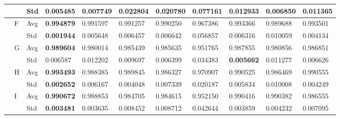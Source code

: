 \documentclass{article} %
\begin{document}
\begin{tabular}{|p{0.5in}|p{0.3in}|p{0.3in}|p{0.5in}|p{0.6in}|p{0.5in}|p{0.5in}|p{0.5in}|p{0.5in}|p{0.5in}|p{0.5in}|}
 &  & Std & \textbf{0.005485 } & 0.007749  & 0.022804  & 0.020780  & 0.077161  & 0.012933  & 0.006850  & 0.011365  \\ \hline 
 & F & Avg & \textbf{0.994879 } & 0.991597  & 0.991257  & 0.990250  & 0.967386  & 0.993366  & 0.989688  & 0.993501  \\ \hline 
 &  & Std & \textbf{0.001944 } & 0.005648  & 0.006457  & 0.006642  & 0.056857  & 0.006316  & 0.010059  & 0.004134  \\ \hline 
 & G & Avg & \textbf{0.989604 } & 0.980014  & 0.985439  & 0.985635  & 0.951765  & 0.987855  & 0.980856  & 0.986851  \\ \hline 
 &  & Std & 0.006587  & 0.012202  & 0.009697  & 0.006399  & 0.034383  & \textbf{0.005662 } & 0.011277  & 0.006626  \\ \hline 
 & H & Avg & \textbf{0.993493 } & 0.988385  & 0.989845  & 0.986327  & 0.970907  & 0.990525  & 0.986469  & 0.990555  \\ \hline 
 &  & Std & \textbf{0.002652 } & 0.006167  & 0.004048  & 0.007339  & 0.020187  & 0.005834  & 0.010008  & 0.004249  \\ \hline 
 & I & Avg & \textbf{0.990672 } & 0.988853  & 0.984705  & 0.984615  & 0.952150  & 0.990416  & 0.990382  & 0.986555  \\ \hline 
 &  & Std & \textbf{0.003481 } & 0.003635  & 0.008452  & 0.008712  & 0.042644  & 0.003859  & 0.004232  & 0.007095  \\ \hline 
\end{tabular}
\end{document}
